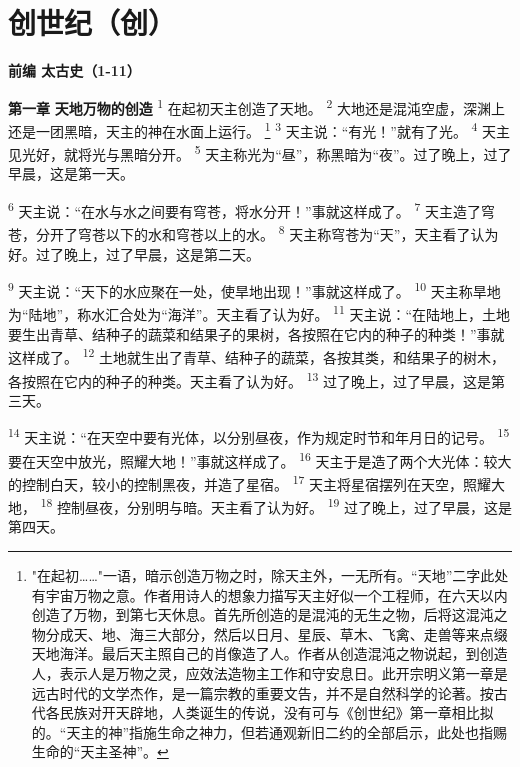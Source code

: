 \chapter{创世纪（创）}

\begin{center}
	\textbf{前编 太古史（1-11）}
\end{center}

\textbf{第一章 }
\textbf{天地万物的创造 }
\textsuperscript{1}
在起初天主创造了天地。
\textsuperscript{2}  
大地还是混沌空虚，深渊上还是一团黑暗，天主的神在水面上运行。
\renewcommand\thefootnote{\ding{\numexpr171+\value{footnote}}}
\footnote{"在起初……"一语，暗示创造万物之时，除天主外，一无所有。“天地”二字此处有宇宙万物之意。作者用诗人的想象力描写天主好似一个工程师，在六天以内创造了万物，到第七天休息。首先所创造的是混沌的无生之物，后将这混沌之物分成天、地、海三大部分，然后以日月、星辰、草木、飞禽、走兽等来点缀天地海洋。最后天主照自己的肖像造了人。作者从创造混沌之物说起，到创造人，表示人是万物之灵，应效法造物主工作和守安息日。此开宗明义第一章是远古时代的文学杰作，是一篇宗教的重要文告，并不是自然科学的论著。按古代各民族对开天辟地，人类诞生的传说，没有可与《创世纪》第一章相比拟的。“天主的神”指施生命之神力，但若通观新旧二约的全部启示，此处也指赐生命的“天主圣神”。}
\textsuperscript{3}
天主说：“有光！”就有了光。
\textsuperscript{4}
天主见光好，就将光与黑暗分开。
\textsuperscript{5}
天主称光为“昼”，称黑暗为“夜”。过了晚上，过了早晨，这是第一天。

\textsuperscript{6}
天主说：“在水与水之间要有穹苍，将水分开！”事就这样成了。
\textsuperscript{7}
天主造了穹苍，分开了穹苍以下的水和穹苍以上的水。
\textsuperscript{8}
天主称穹苍为“天”，天主看了认为好。过了晚上，过了早晨，这是第二天。

\textsuperscript{9}
天主说：“天下的水应聚在一处，使旱地出现！”事就这样成了。
\textsuperscript{10}
天主称旱地为“陆地”，称水汇合处为“海洋”。天主看了认为好。
\textsuperscript{11}
天主说：“在陆地上，土地要生出青草、结种子的蔬菜和结果子的果树，各按照在它内的种子的种类！”事就这样成了。
\textsuperscript{12}
土地就生出了青草、结种子的蔬菜，各按其类，和结果子的树木，各按照在它内的种子的种类。天主看了认为好。
\textsuperscript{13}
过了晚上，过了早晨，这是第三天。

\textsuperscript{14}
天主说：“在天空中要有光体，以分别昼夜，作为规定时节和年月日的记号。
\textsuperscript{15}
要在天空中放光，照耀大地！”事就这样成了。
\textsuperscript{16}
天主于是造了两个大光体：较大的控制白天，较小的控制黑夜，并造了星宿。
\textsuperscript{17}
天主将星宿摆列在天空，照耀大地，
\textsuperscript{18}
控制昼夜，分别明与暗。天主看了认为好。
\textsuperscript{19}
过了晚上，过了早晨，这是第四天。

